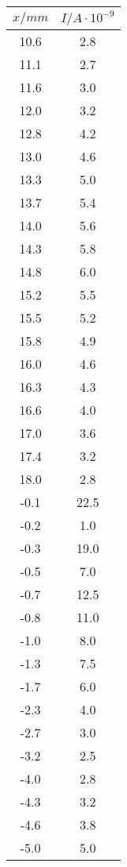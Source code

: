 \begin{table}
\begin{minipage}{0.25\textwidth}
\end{minipage}
\begin{minipage}{0.25\textwidth}
	\label{tab:b}
	\begin{tabular}{c|c}
		\toprule
		{$x / mm$} & {$I / A\cdot10^{-9}$} \\
		\hline
        \midrule
        10.6 & 2.8\\
        11.1 & 2.7\\
        11.6 & 3.0\\
        12.0 & 3.2\\
        12.8 & 4.2\\
        13.0 & 4.6\\
        13.3 & 5.0\\
        13.7 & 5.4\\
        14.0 & 5.6\\
        14.3 & 5.8\\
        14.8 & 6.0\\
        15.2 & 5.5\\
        15.5 & 5.2\\
        15.8 & 4.9\\
        16.0 & 4.6\\
        16.3 & 4.3\\
        16.6 & 4.0\\
        17.0 & 3.6\\
        17.4 & 3.2\\
        18.0 & 2.8\\
        -0.1 & 22.5\\
        -0.2 & 1.0\\
        -0.3 & 19.0\\
        -0.5 & 7.0\\
        -0.7 & 12.5\\
        -0.8 & 11.0\\
        -1.0 & 8.0\\
        -1.3 & 7.5\\
        -1.7 & 6.0\\
        -2.3 & 4.0\\
        -2.7 & 3.0\\
        -3.2 & 2.5\\
        -4.0 & 2.8\\
        -4.3 & 3.2\\
        -4.6 & 3.8\\
        -5.0 & 5.0\\
		\bottomrule 
	\end{tabular}
\end{minipage}

\end{table}
